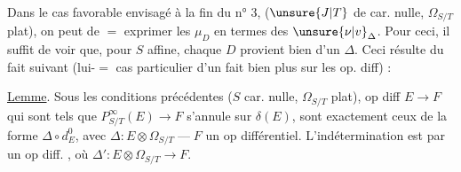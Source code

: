 Dans le cas favorable envisagé à la fin du n° 3, ($\unsure{J|T}$ de car. nulle, $\Omega_{S/T}$ plat), on peut de $=$ exprimer les $\mu_D$ en termes des $\unsure{\nu|v}_\Delta$. Pour ceci, il suffit de voir que, pour $S$ affine, chaque $D$ provient bien d'un $\Delta$. Ceci résulte du fait suivant (lui-$=$ cas particulier d'un fait bien plus  sur les op. diff) : 

\uline{Lemme}. Sous les conditions précédentes ($S$ car. nulle, $\Omega_{S/T}$ plat),   op diff $E\longrightarrow F$ qui sont tels que $P^\infty_{S/T}(E)\longrightarrow F$ s'annule sur $\delta(E)$, sont exactement ceux  de la forme $\Delta\circ d^0_E$, avec $\Delta:E\otimes\Omega_{S/T}\mathrel{\text{---}}F$ un op différentiel. L'indétermination est   par un op diff.  , où $\Delta':E\otimes\Omega_{S/T}\longrightarrow F$.

